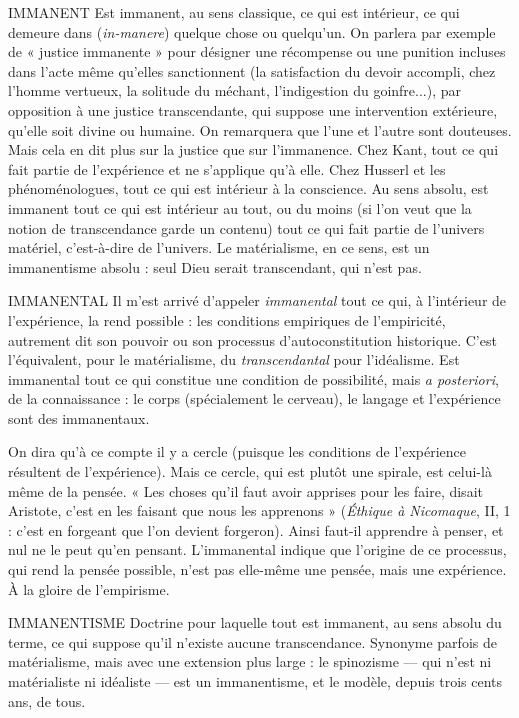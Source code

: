 IMMANENT Est immanent, au sens classique, ce qui est intérieur, ce qui
demeure dans ({\it in-manere}) quelque chose ou quelqu'un. On
parlera par exemple de « justice immanente » pour désigner une récompense ou
une punition incluses dans l’acte même qu’elles sanctionnent (la satisfaction du
devoir accompli, chez l’homme vertueux, la solitude du méchant, l’indigestion
du goinfre...), par opposition à une justice transcendante, qui suppose une intervention
extérieure, qu’elle soit divine ou humaine. On remarquera que l’une et
l’autre sont douteuses. Mais cela en dit plus sur la justice que sur l’immanence.
Chez Kant, tout ce qui fait partie de l’expérience et ne s'applique qu’à elle.
Chez Husserl et les phénoménologues, tout ce qui est intérieur à la conscience.
Au sens absolu, est immanent tout ce qui est intérieur au tout, ou du moins
(si l’on veut que la notion de transcendance garde un contenu) tout ce qui fait
partie de l’univers matériel, c’est-à-dire de l’univers. Le matérialisme, en ce
sens, est un immanentisme absolu : seul Dieu serait transcendant, qui n’est pas.

IMMANENTAL Il m'est arrivé d’appeler {\it immanental} tout ce qui, à l’intérieur
de l'expérience, la rend possible : les conditions
empiriques de l’empiricité, autrement dit son pouvoir ou son processus d’autoconstitution
historique. C’est l’équivalent, pour le matérialisme, du {\it transcendantal}
pour l’idéalisme. Est immanental tout ce qui constitue une condition de
possibilité, mais {\it a posteriori}, de la connaissance : le corps (spécialement le cerveau),
le langage et l'expérience sont des immanentaux.

On dira qu’à ce compte il y a cercle (puisque les conditions de l’expérience
résultent de l'expérience). Mais ce cercle, qui est plutôt une spirale, est celui-là
même de la pensée. « Les choses qu’il faut avoir apprises pour les faire, disait
Aristote, c’est en les faisant que nous les apprenons » ({\it Éthique à Nicomaque}, II,
1 : c'est en forgeant que l’on devient forgeron). Ainsi faut-il apprendre à
penser, et nul ne le peut qu’en pensant. L’immanental indique que l’origine de
ce processus, qui rend la pensée possible, n’est pas elle-même une pensée, mais
une expérience. À la gloire de l’empirisme.

IMMANENTISME Doctrine pour laquelle tout est immanent, au sens
absolu du terme, ce qui suppose qu’il n'existe aucune
transcendance. Synonyme parfois de matérialisme, mais avec une extension
plus large : le spinozisme — qui n’est ni matérialiste ni idéaliste — est un immanentisme,
et le modèle, depuis trois cents ans, de tous.

